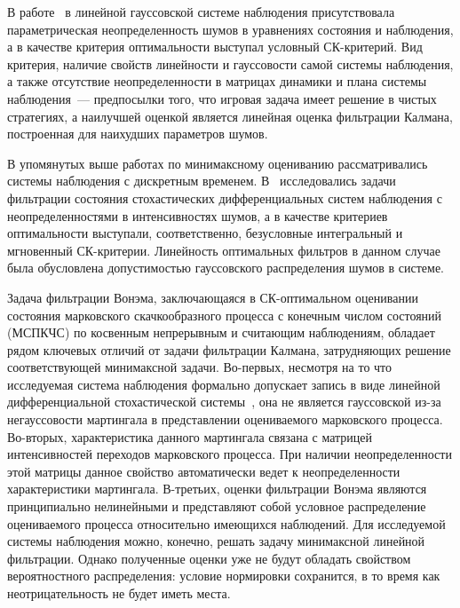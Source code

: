 \begin{multicols}{2}
 В работе~\cite{k_k} в линейной гауссовской системе наблюдения
 присутствовала параметрическая неопределенность шумов в уравнениях
 состояния и наблюдения, а в качестве критерия оптимальности
 выступал условный СК-критерий. Вид критерия, наличие свойств линейности и
 гауссовости самой системы наблюдения, а также отсутствие
 неопределенности в матрицах динамики и плана системы наблюдения~---
 предпосылки того, что игровая задача имеет решение в чистых
 стратегиях, а наилучшей оценкой является линейная оценка фильтрации
 Калмана, построенная для наихудших пара\-мет\-ров шумов.

 В упомянутых выше работах по минимаксному оцениванию рассматривались
 системы наблюдения с дискретным временем. В~\cite{p_m, s_l_p}
 исследовались задачи фильтрации состояния
 стохастических дифференциальных систем наблюдения с
 неопределенностями в интенсивностях шумов, а в качестве критериев
 оптимальности выступали, соответственно, безусловные интегральный и мгновенный
 СК-критерии. Линейность оптимальных фильтров в
 данном случае была обусловлена допустимостью гауссовского
 распределения шумов в системе.

 Задача фильтрации Вонэма, заключающаяся в СК-оп\-ти\-маль\-ном оценивании
 состояния марковского скачкообразного процесса с конечным чис\-лом
 состояний (МСПКЧС) по косвенным непре\-рыв\-ным и считающим наблюдениям, об\-ла\-дает %
 \mbox{рядом} ключевых отличий от задачи фильтрации Калмана, затрудняющих решение
 со\-от\-вет\-ст\-ву\-ющей минимаксной задачи.
 Во-первых, несмотря на то что исследуемая система наблюдения
 формально допускает запись в виде линейной дифференциальной стохастической
 системы~\cite{elliott2}, она не является гауссовской из-за негауссовости мартингала
 в представлении оцениваемого марковского процесса.
 Во-вторых,
 характеристика данного мартингала связана с матрицей интенсивностей
 переходов марковского процесса. При наличии неопределенности этой
 матрицы данное свойство автоматически ведет к
 неопределенности характеристики мартингала.
 В-третьих,
 оценки фильтрации Вонэма являются принципиально нелинейными и представляют собой
 условное распределение оцениваемого процесса относительно имеющихся
 наблюдений. Для исследуемой системы наблюдения %
 можно, конечно, решать задачу минимаксной
 линейной фильтрации. Однако полученные оценки уже не будут
 обладать свойством вероятностного распределения: условие нормировки
 сохранится, в то время как неотрицательность не будет иметь места.



\end{multicols}
